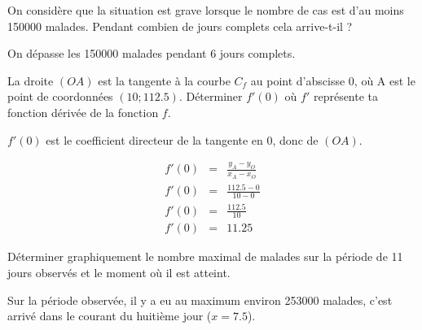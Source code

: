 \begin{questions}
	\question[2] On considère que la situation est grave lorsque le nombre de cas est d'au moins \num{150000} malades. Pendant combien de jours complets cela arrive-t-il ?
	\begin{solution}
		On dépasse les \num{150000} malades pendant 6 jours complets.
	\end{solution}
	
	\question[2] La droite $(OA)$ est la tangente à la courbe $C_f$ au point d'abscisse 0, où A est le point de coordonnées $(10;\num{112.5})$. Déterminer $f'(0)$ où $f'$ représente ta fonction dérivée de la fonction $f$.\label{q:drv}
	\begin{solution}
		$f'(0)$ est le coefficient directeur de la tangente en 0, donc de $(OA)$.
		
		\begin{eqnarray*}
			f'(0) &=& \frac{y_A - y_O}{x_A - x_O} \\
			f'(0) &=& \frac{\num{112.5} - 0}{10 - 0} \\
			f'(0) &=& \frac{\num{112.5}}{10} \\
			f'(0) &=& \num{11.25}
		\end{eqnarray*}
	\end{solution}
	
	\question[2] %
			Déterminer graphiquement le nombre maximal de malades sur la période de 11 jours observés et le moment où il est atteint. %
			\begin{solution}
				Sur la période observée, il y a eu au maximum environ \num{253000} malades, c'est arrivé dans le courant du huitième jour ($x=\num{7.5}$).
			\end{solution}
			
\end{questions}


